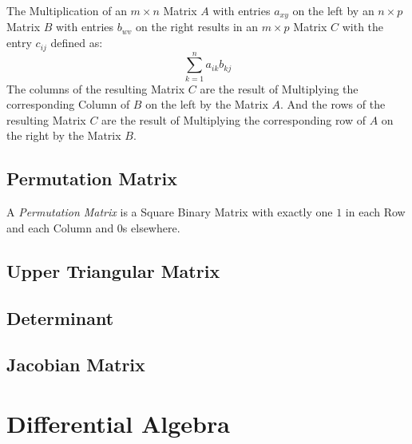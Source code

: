 The Multiplication of an $m \times n$ Matrix $A$ with entries $a_{xy}$
on the left by an $n \times p$ Matrix $B$ with entries $b_{wv}$ on the
right results in an $m \times p$ Matrix $C$ with the entry $c_{ij}$
defined as:
\[
  \sum_{k=1}^n a_{ik} b_{kj}
\]
The columns of the resulting Matrix $C$ are the result of Multiplying
the corresponding Column of $B$ on the left by the Matrix $A$. And the
rows of the resulting Matrix $C$ are the result of Multiplying the
corresponding row of $A$ on the right by the Matrix $B$.



\subsection{Permutation Matrix}\label{sec:permutation_matrix}

A \emph{Permutation Matrix} is a Square Binary Matrix with exactly one
$1$ in each Row and each Column and $0$s elsewhere.



\subsection{Upper Triangular Matrix}\label{sec:upper_triangular}

\subsection{Determinant}\label{sec:determinant}

\subsection{Jacobian Matrix}\label{sec:jacobian_matrix}



\section{Differential Algebra}\label{sec:differential_algebra}

